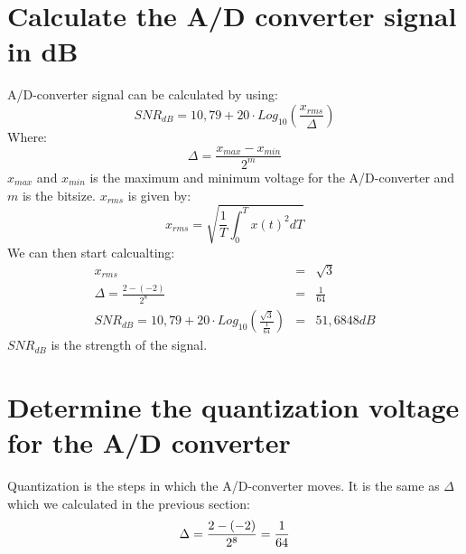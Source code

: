 \documentclass[a4wide,10pt]{article}
\begin{document}
\section{Calculate the A/D converter signal in dB} %
\label{sec:calculate_the_a_d_converter_signal_in_db}
A/D-converter signal can be calculated by using:
\begin{equation}
	SNR_{dB} = 10,79 + 20 \cdot Log_{10}(\frac{x_{rms}}{\Delta})
\end{equation}
Where:
\begin{equation}
	\Delta = \frac{x_{max} - x_{min}}{2^m}
\end{equation}
$x_{max}$ and $x_{min}$ is the maximum and minimum voltage for the A/D-converter and $m$ is the bitsize.
$x_{rms}$ is given by:
\begin{equation}
	x_{rms} = \sqrt{\frac{1}{T}\int_0^T x(t)^2 dT}
\end{equation}
We can then start calcualting:
\begin{eqnarray}
	x_{rms} &=& \sqrt{3} \nonumber \\
	\Delta = \frac{2 - (-2)}{2^8} &=& \frac{1}{64} \nonumber \\
	SNR_{dB} = 10,79 + 20 \cdot Log_{10}(\frac{\sqrt{3}}{\frac{1}{64}}) &=& 51,6848dB \nonumber
\end{eqnarray}
$SNR_{dB}$ is the strength of the signal.

\section{Determine the quantization voltage for the A/D converter} %
\label{sec:determine_the_quantization_voltage_for_the_a_d_converter}
Quantization is the steps in which the A/D-converter moves. It is the same as $\Delta$ which we calculated in the previous section:
\begin{equation}
	\Delta = \frac{2 - (-2)}{2^8} = \frac{1}{64} \nonumber \\
\end{equation}
\end{document}
